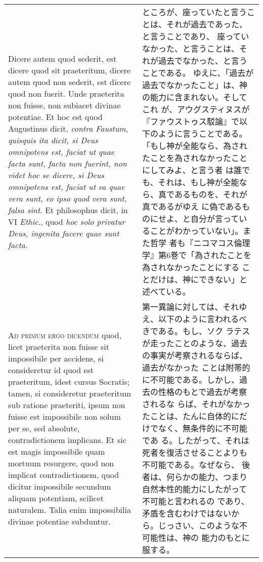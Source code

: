 \documentclass[10pt]{jsarticle} %
\begin{document}
\begin{longtable}{p{21em}p{21em}}
Dicere autem quod sederit, est dicere
quod sit praeteritum, dicere autem quod non sederit, est dicere quod non
fuerit. Unde praeterita non fuisse, non subiacet divinae potentiae. Et
hoc est quod Augustinus dicit, {\itshape contra Faustum}, {\itshape quisquis ita dicit, si
Deus omnipotens est, faciat ut quae facta sunt, facta non fuerint, non
videt hoc se dicere, si Deus omnipotens est, faciat ut ea quae vera
sunt, eo ipso quod vera sunt, falsa sint}. Et philosophus dicit, in VI
{\itshape Ethic}., quod {\itshape hoc solo privatur Deus, ingenita facere quae sunt facta}.


&

ところが、座っていたと言うことは、それが過去であった、と言うことであり、
座っていなかった、と言うことは、それが過去でなかった、と言うことである。
ゆえに、「過去が過去でなかったこと」は、神の能力に含まれない。そしてこれ
が、アウグスティヌスが『ファウストゥス駁論』で以下のように言うことである。
「もし神が全能なら、為されたことを為されなかったことにしてみよ、と言う者
は誰でも、それは、もし神が全能なら、真であるものを、それが真であるがゆえ
に偽であるものにせよ、と自分が言っていることがわかっていない」。また哲学
者も『ニコマコス倫理学』第6巻で「為されたことを為されなかったことにする
ことだけは、神にできない」と述べている。


\\


{\scshape Ad primum ergo dicendum} quod, licet praeterita non fuisse sit
impossibile per accidens, si consideretur id quod est praeteritum, idest
cursus Socratis; tamen, si consideretur praeteritum sub ratione
praeteriti, ipsum non fuisse est impossibile non solum per se, sed
absolute, contradictionem implicans. Et sic est magis impossibile quam
mortuum resurgere, quod non implicat contradictionem, quod dicitur
impossibile secundum aliquam potentiam, scilicet naturalem. Talia enim
impossibilia divinae potentiae subduntur.


&

第一異論に対しては、それゆえ、以下のように言われるべきである。もし、ソク
ラテスが走ったことのような、過去の事実が考察されるならば、過去がなかった
ことは附帯的に不可能である。しかし、過去の性格のもとで過去が考察されるな
らば、それがなかったことは、たんに自体的にだけでなく、無条件的に不可能であ
る。したがって、それは死者を復活させることよりも不可能である。なぜなら、
後者は、何らかの能力、つまり自然本性的能力にしたがって不可能と言われるの
であり、矛盾を含むわけではないから。じっさい、このような不可能性は、神の
能力のもとに服する。


\end{longtable}
\end{document}
